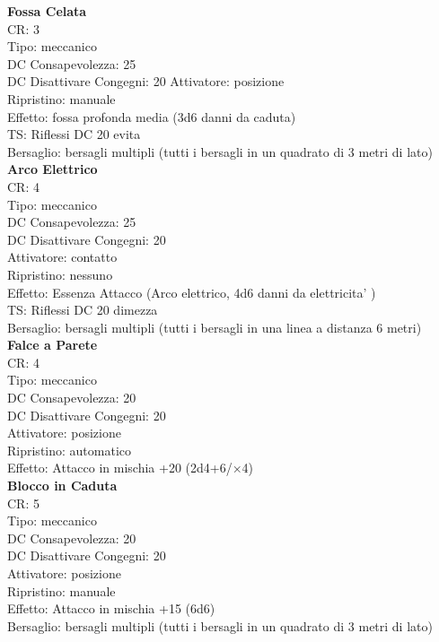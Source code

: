 \documentclass[a4paper,11pt,twoside,openany]{dndbook}
\begin{document}
\begin{multicols}{2}
\textbf{Fossa Celata}\\
CR: 3 \\
Tipo: meccanico \\
DC Consapevolezza: 25 \\
DC Disattivare Congegni: 20 
Attivatore: posizione \\
Ripristino: manuale \\
Effetto: fossa profonda media (3d6 danni da caduta) \\
TS: Riflessi DC 20 evita \\
Bersaglio: bersagli multipli (tutti i bersagli in un quadrato di 3 metri di lato)\\

\textbf{Arco Elettrico}\\
CR: 4 \\
Tipo: meccanico \\
DC Consapevolezza: 25 \\
DC Disattivare Congegni: 20 \\
Attivatore: contatto \\
Ripristino: nessuno \\
Effetto: Essenza Attacco (Arco elettrico, 4d6 danni da elettricita' )\\
TS: Riflessi DC 20 dimezza \\
Bersaglio: bersagli multipli (tutti i bersagli in una linea a distanza 6 metri)\\

\textbf{Falce a Parete}\\
CR: 4 \\
Tipo: meccanico \\
DC Consapevolezza: 20 \\
DC Disattivare Congegni: 20 \\
Attivatore: posizione \\
Ripristino: automatico \\
Effetto: Attacco in mischia +20 (2d4+6/×4)\\

\textbf{Blocco in Caduta}\\
CR: 5 \\
Tipo: meccanico \\
DC Consapevolezza: 20 \\
DC Disattivare Congegni: 20 \\
Attivatore: posizione \\
Ripristino: manuale \\
Effetto: Attacco in mischia +15 (6d6) \\
Bersaglio: bersagli multipli (tutti i bersagli in un quadrato di 3 metri di lato)\\


\end{multicols}
\end{document}
